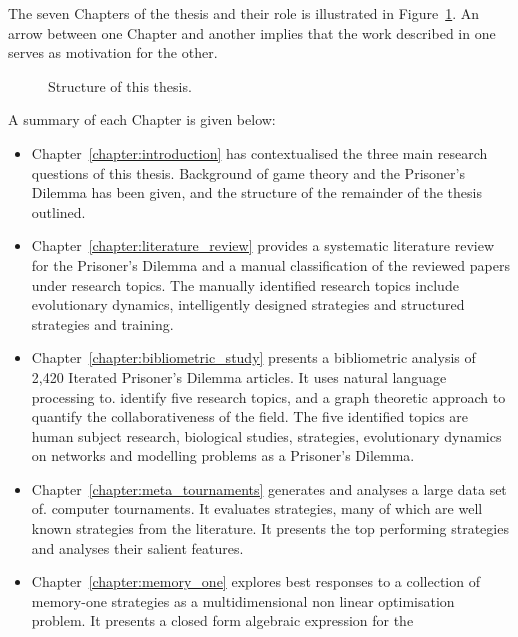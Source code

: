 The seven Chapters of the thesis and their role is illustrated in
Figure~\ref{fig:structure_of_thesis}. An arrow between one Chapter and another
implies that the work described in one serves as motivation for the other.

\begin{figure}[!hbtp]
    \centering
    
    \caption{Structure of this thesis.}\label{fig:structure_of_thesis}
\end{figure}

A summary of each Chapter is given below:

\begin{itemize}
    \item Chapter~\ref{chapter:introduction} has contextualised the three main
    research questions of this thesis. Background of game theory and the
    Prisoner's Dilemma has been given, and the structure
    of the remainder of the thesis outlined.
    \item Chapter~\ref{chapter:literature_review} provides a systematic
    literature review for the Prisoner's Dilemma and a manual classification of
    the reviewed papers under research topics. The manually identified research
    topics include evolutionary dynamics, intelligently designed strategies
    and structured strategies and training.
    \item Chapter~\ref{chapter:bibliometric_study} presents a bibliometric
    analysis of 2,420 Iterated Prisoner's Dilemma articles. It uses natural language processing to. %
    identify five research topics, and a graph theoretic approach to quantify the
    collaborativeness of the field. The five identified topics are human subject
    research, biological studies, strategies, evolutionary dynamics on networks
    and modelling problems as a Prisoner's Dilemma.
    \item Chapter~\ref{chapter:meta_tournaments} generates and analyses a large data set of. %
    computer tournaments. It evaluates \numberofstrategies strategies, many of
    which are well known strategies from the literature.
    It presents the top performing strategies and analyses their salient features.  %
    \item Chapter~\ref{chapter:memory_one} explores best responses to a
    collection of memory-one strategies as a multidimensional non linear
    optimisation problem. It presents a closed form algebraic expression for the

\end{itemize}

